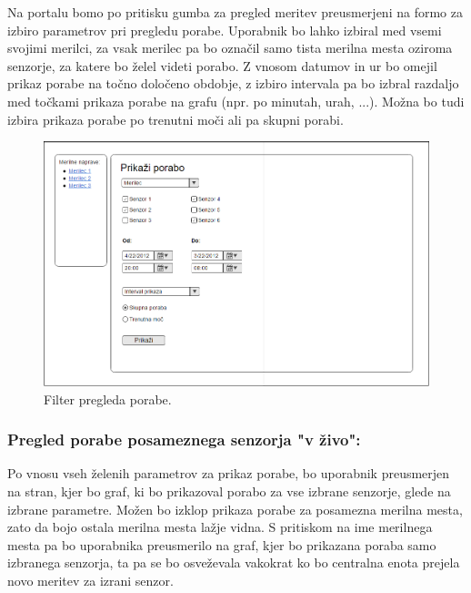 \documentclass[12pt,a4paper,titlepage,openany]{report}
\begin{document}
Na portalu bomo po pritisku gumba za pregled meritev preusmerjeni na formo za izbiro parametrov pri pregledu porabe. Uporabnik bo lahko izbiral med vsemi svojimi merilci, za vsak merilec pa bo označil samo tista merilna mesta oziroma senzorje, za katere bo želel videti porabo. Z vnosom datumov in ur bo omejil prikaz porabe na točno določeno obdobje, z izbiro intervala pa bo izbral razdaljo med točkami prikaza porabe na grafu (npr. po minutah, urah, ...). Možna bo tudi izbira prikaza porabe po trenutni moči ali pa skupni porabi.

\begin{figure}[H]
\begin{center}
\includegraphics[width=1\linewidth]{Slike/IzbiraPregledaPorabe.png}
\end{center}
\caption{Filter pregleda porabe.}\label{slika:IzbiraPregledaPorabe}
\end{figure}

\subsubsection{Pregled porabe posameznega senzorja "v živo":}
Po vnosu vseh želenih parametrov za prikaz porabe, bo uporabnik preusmerjen na stran, kjer bo graf, ki bo prikazoval porabo za vse izbrane senzorje, glede na izbrane parametre. Možen bo izklop prikaza porabe za posamezna merilna mesta, zato da bojo ostala merilna mesta lažje vidna. S pritiskom na ime merilnega mesta pa bo uporabnika preusmerilo na graf, kjer bo prikazana poraba samo izbranega senzorja, ta pa se bo osveževala vakokrat ko bo centralna enota prejela novo meritev za izrani senzor.
\end{document}
